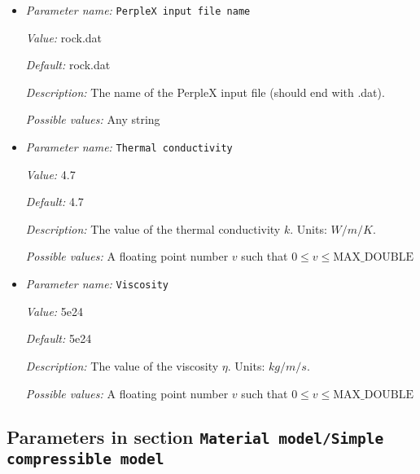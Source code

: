 \begin{itemize}
{\it Value:} 0.


{\it Default:} 0.


{\it Description:} The value of the minimum temperature used to query PerpleX. Units: $K$.


{\it Possible values:} A floating point number $v$ such that $0 \leq v \leq \text{MAX\_DOUBLE}$
\item {\it Parameter name:} {\tt PerpleX input file name}
\label{parameters:Material model/PerpleX lookup model/PerpleX input file name}


{\it Value:} rock.dat


{\it Default:} rock.dat


{\it Description:} The name of the PerpleX input file (should end with .dat).


{\it Possible values:} Any string
\item {\it Parameter name:} {\tt Thermal conductivity}
\label{parameters:Material model/PerpleX lookup model/Thermal conductivity}


{\it Value:} 4.7


{\it Default:} 4.7


{\it Description:} The value of the thermal conductivity $k$. Units: $W/m/K$.


{\it Possible values:} A floating point number $v$ such that $0 \leq v \leq \text{MAX\_DOUBLE}$
\item {\it Parameter name:} {\tt Viscosity}
\label{parameters:Material model/PerpleX lookup model/Viscosity}


{\it Value:} 5e24


{\it Default:} 5e24


{\it Description:} The value of the viscosity $\eta$. Units: $kg/m/s$.


{\it Possible values:} A floating point number $v$ such that $0 \leq v \leq \text{MAX\_DOUBLE}$
\end{itemize}

\subsection{Parameters in section \tt Material model/Simple compressible model}
\label{parameters:Material_20model/Simple_20compressible_20model}

